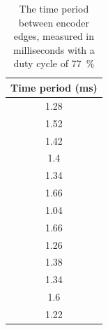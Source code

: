 \documentclass[../../main.tex]{subfiles}
\begin{document}
\begin{table}[H]
    \centering
    \begin{tabular}{c}
         Time period (ms) \\
         \hline
         1.28 \\
         1.52 \\
         1.42 \\
         1.4 \\
         1.34 \\
         1.66 \\
         1.04 \\
         1.66 \\
         1.26 \\
         1.38 \\
         1.34 \\
         1.6 \\
         1.22 \\
         \hline
    \end{tabular}
    \caption{The time period between encoder edges, measured in milliseconds with a duty cycle of \SI{77}{\percent} }
    \label{tab:EncoderDifferenceBetweenEdges}
\end{table}
\end{document}

